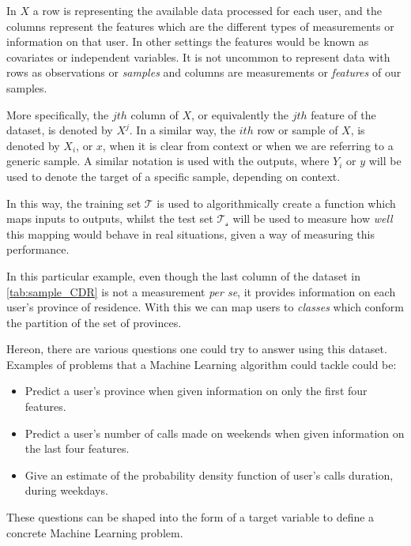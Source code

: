 In $X$ a row is representing the available data processed for each user, and the columns represent the features which are the different types of measurements or information on that user.
In other settings the features would be known as covariates or independent variables.
It is not uncommon to represent data with rows as observations or \textit{samples} and columns are measurements or \textit{features} of our samples.

More specifically, the $jth$ column of $X$, or equivalently the $jth$ feature of the dataset, is denoted by $X^j$.
In a similar way, the $ith$ row or sample of $X$, is denoted by $X_i$, or $x$, when it is clear from context or when we are referring to a generic sample.
A similar notation is used with the outputs, where $Y_i$ or $y$ will be used to denote the target of a specific sample, depending on context.

In this way, the training set $\mathcal{T}$ is used to algorithmically create a function which maps inputs to outputs,  whilst the test set $\mathcal{T_s}$ will be used to measure how \textit{well} this mapping would behave in real situations, given a way of measuring this performance.

In this particular example, even though the last column of the dataset in \cref{tab:sample_CDR} is not a measurement \textit{per se}, it provides information on each user's province of residence.
With this we can map users to \textit{classes} which conform the partition of the set of provinces.

Hereon, there are various questions one could try to answer using this dataset.
Examples of problems that a Machine Learning algorithm could tackle could be:
\begin{itemize}
\item Predict a user's province when given information on only the first four features.
\item Predict a user's number of calls made on weekends when given information on the last four features.
\item Give an estimate of the probability density function of user's calls duration, during weekdays.
\end{itemize}

These questions can be shaped into the form of a target variable to define a concrete Machine Learning problem.

